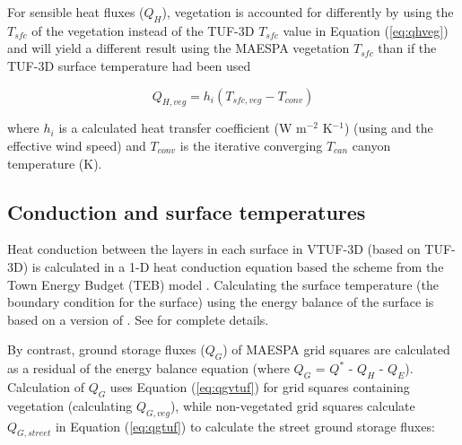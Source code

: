 \documentclass[final,3p,times,authoryear]{elsarticle}
\begin{document}

For sensible heat fluxes ($Q_{H}$), vegetation is accounted for differently by using the $T_{sfc}$ of the vegetation instead of the TUF-3D $T_{sfc}$ value in Equation (\ref{eq:qhveg}) and will yield a different result using the MAESPA vegetation $T_{sfc}$ than if the TUF-3D surface temperature had been used

\begin{equation}\label{eq:qhveg}
 Q_{H,veg} = h_{i}  (T_{sfc,veg}-T_{conv}) 
\end{equation}

where $h_{i}$ is a calculated heat transfer coefficient (W m$^{-2}$ K$^{-1}$) (using \cite{Mascart1995} and the effective wind speed) and $T_{conv}$ is the iterative converging $T_{can}$ canyon temperature (K).


\subsection{Conduction and surface temperatures}

Heat conduction between the layers in each surface in VTUF-3D (based on TUF-3D) is calculated in a 1-D heat conduction equation based the scheme from the Town Energy Budget (TEB) model \citep{Masson2000}. Calculating the surface temperature (the boundary condition for the surface) using the energy balance of the surface is based on a version of \cite{Arnfield1990}. See \cite{Krayenhoff2007} for complete details.


By contrast, ground storage fluxes ($Q_{G}$) of MAESPA grid squares are calculated as a residual of the energy balance equation (where $Q_{G}$ = $Q^{*}$ - $Q_{H}$ - $Q_{E}$). Calculation of $Q_{G}$ uses Equation (\ref{eq:qgvtuf}) for grid squares containing vegetation (calculating $Q_{G,veg}$), while non-vegetated grid squares calculate $Q_{G,street}$ in Equation (\ref{eq:qgtuf}) to calculate the street ground storage fluxes:
\end{document}
